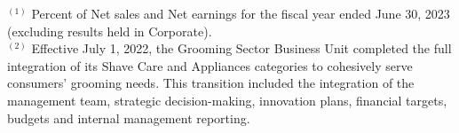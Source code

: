 \documentclass{article}
\begin{document}
\vspace{1em}
\noindent\footnotesize
$^{(1)}$ Percent of Net sales and Net earnings for the fiscal year ended June 30, 2023 (excluding results held in Corporate).\\
$^{(2)}$ Effective July 1, 2022, the Grooming Sector Business Unit completed the full integration of its Shave Care and Appliances categories to cohesively serve consumers’ grooming needs. This transition included the integration of the management team, strategic decision-making, innovation plans, financial targets, budgets and internal management reporting.
\end{document}
